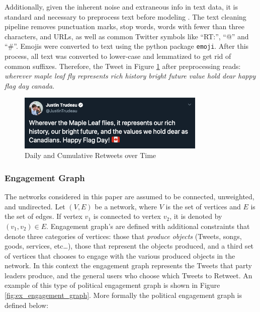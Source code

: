Additionally, given the inherent noise and extraneous info in text data, it is
standard and necessary to preprocess text before modeling
\cite{sapul2017trending}. The text cleaning pipeline removes punctuation marks,
stop words, words with fewer than three characters, and URLs, as well as common
Twitter symbols like ``RT:'', ``@'' and ``\#''. Emojis were converted to text
using the python package \texttt{emoji}. After this process, all text was
converted to lower-case and lemmatized to get rid of common suffixes. Therefore,
the Tweet in Figure \ref{fig:tweet_ex} after preprocessing reads: \emph{wherever
maple leaf fly represents rich history bright future value hold dear happy flag
day canada}.

\begin{figure}[h!]
  \centering
  \includegraphics[width=0.8\textwidth]{figures/tweet_ex}
  \caption[Daily and Cumulative Retweets over Time]{Daily and Cumulative Retweets over Time}
  \label{fig:tweet_ex}
\end{figure}

\subsubsection{Engagement Graph}

The networks considered in this paper are assumed to be connected, unweighted,
and undirected. Let $(V,E)$ be a network, where $V$ is the set of vertices and
$E$ is the set of edges. If vertex $v_1$ is connected to vertex $v_2$, it is
denoted by $(v_1,v_2)\in E$. Engagement graph's are defined with additional
constraints that denote three categories of vertices: those that \emph{produce
objects} (Tweets, songs, goods, services, etc\dots), those that represent the
objects produced, and a third set of vertices that chooses to engage with the
various produced objects in the network. In this context the engagement graph
represents the Tweets that party leaders produce, and the general users who
choose which Tweets to Retweet. An example of this type of political engagement
graph is shown in Figure \ref{fig:ex_engagement_graph}. More formally the
political engagement graph is defined below:

